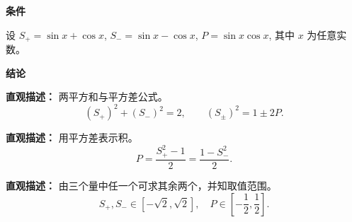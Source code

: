 \begin{statementbox}
	\textbf{\textcolor{CStatement}{条件}}
	\begin{description}[style=nextline, leftmargin=2.8em, labelsep=0.5em, itemsep=0.35em]
		\item[\textbf{\textcolor{CStatement}{条件1（定义记号）：}}]
			设 $S_{+}=\sin x+\cos x$, $S_{-}=\sin x-\cos x$, $P=\sin x\cos x$, 其中 $x$ 为任意实数。
	\end{description}

	\medskip
	\textbf{\textcolor{CStatement}{结论}}
	\begin{description}[style=nextline, leftmargin=2.8em, labelsep=0.5em, itemsep=0.45em]
		\item[\textbf{\textcolor{CStatement}{结论一（平方关系）：}}]
			\textbf{\textcolor{CStatement}{直观描述：}}
			两平方和与平方差公式。
			\[
				(S_{+})^{2}+(S_{-})^{2}=2,
				\qquad
				(S_{\pm})^{2}=1\pm 2P.
			\]
		\item[\textbf{\textcolor{CStatement}{结论二（互化公式）：}}]
			\textbf{\textcolor{CStatement}{直观描述：}}
			用平方差表示积。
			\[
				P=\frac{S_{+}^{2}-1}{2}=\frac{1-S_{-}^{2}}{2}.
			\]
		\item[\textbf{\textcolor{CStatement}{推广结论（知一求二）：}}]
			\textbf{\textcolor{CStatement}{直观描述：}}
			由三个量中任一个可求其余两个，并知取值范围。
			\[
				S_{+},S_{-}\in[-\sqrt{2},\sqrt{2}],\quad P\in\left[-\frac12,\frac12\right].
			\]
	\end{description}

\end{statementbox}
